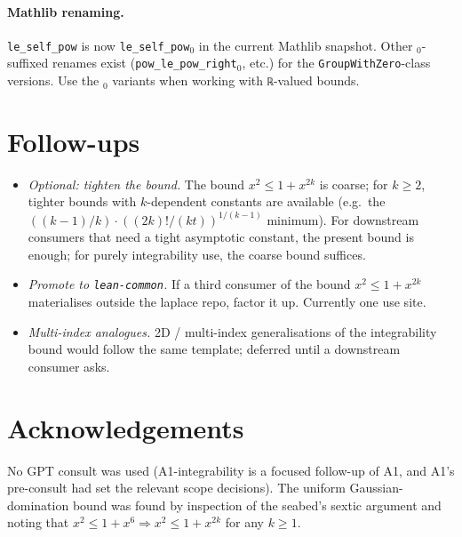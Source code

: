 \documentclass[11pt]{article}
\begin{document}
\paragraph{Mathlib renaming.} \texttt{le\_self\_pow} is now
\texttt{le\_self\_pow$_0$} in the current Mathlib snapshot. Other
\texttt{$_0$}-suffixed renames exist (\texttt{pow\_le\_pow\_right$_0$},
etc.) for the \texttt{GroupWithZero}-class versions. Use the
\texttt{$_0$} variants when working with \texttt{ℝ}-valued bounds.

\section{Follow-ups}

\begin{itemize}[leftmargin=1.5em]
\item \emph{Optional: tighten the bound.} The bound
  $x^2 \le 1 + x^{2k}$ is coarse; for $k \ge 2$, tighter bounds
  with $k$-dependent constants are available (e.g.\ the
  $((k-1)/k) \cdot ((2k)!/(kt))^{1/(k-1)}$ minimum). For downstream
  consumers that need a tight asymptotic constant, the present bound
  is enough; for purely integrability use, the coarse bound suffices.
\item \emph{Promote to \texttt{lean-common}.} If a third consumer of
  the bound $x^2 \le 1 + x^{2k}$ materialises outside the laplace
  repo, factor it up. Currently one use site.
\item \emph{Multi-index analogues.} 2D / multi-index generalisations
  of the integrability bound would follow the same template; deferred
  until a downstream consumer asks.
\end{itemize}

\section*{Acknowledgements}

No GPT consult was used (A1-integrability is a focused follow-up of
A1, and A1's pre-consult had set the relevant scope decisions). The
uniform Gaussian-domination bound was found by inspection of the
seabed's sextic argument and noting that
$x^2 \le 1 + x^6 \Rightarrow x^2 \le 1 + x^{2k}$ for any $k \ge 1$.
\end{document}
